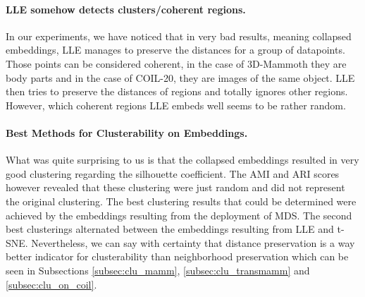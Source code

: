 \paragraph{LLE somehow detects clusters/coherent regions.}
In our experiments, we have noticed that in very bad results, meaning collapsed embeddings, LLE manages to preserve the distances for a group of datapoints. Those points can be considered coherent, in the case of 3D-Mammoth they are body parts and in the case of COIL-20, they are images of the same object. LLE then tries to preserve the distances of regions and totally ignores other regions. However, which coherent regions LLE embeds well seems to be rather random.

\paragraph{Best Methods for Clusterability on Embeddings.}
What was quite surprising to us is that the collapsed embeddings resulted in very good clustering regarding the silhouette coefficient. The AMI and ARI scores however revealed that these clustering were just random and did not represent the original clustering. The best clustering results that could be determined were achieved by the embeddings resulting from the deployment of MDS. The second best clusterings alternated between the embeddings resulting from LLE and t-SNE. Nevertheless, we can say with certainty that distance preservation is a way better indicator for clusterability than neighborhood preservation which can be seen in Subsections \ref{subsec:clu_mamm}, \ref{subsec:clu_transmamm} and \ref{subsec:clu_on_coil}.